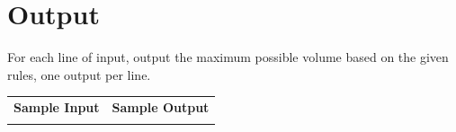 \documentclass{article}
\begin{document}
\section{Output}
For each line of input, output the maximum possible volume based on the given
rules, one output per line.
\vskip 16pt
\noindent
\setlength{\extrarowheight}{4pt}
\begin{tabularx}{\textwidth}{ | X | X | }
\hline
\textbf{Sample Input} & \textbf{Sample Output} \\

&

\\
\hline
\end{tabularx}
\end{document}

